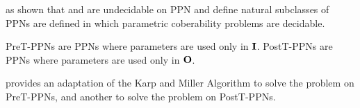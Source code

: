 \todo{}
\cite{David17} as shown that \Ucov and \Ecov are undecidable on \ac{PPN} and define natural subclasses of \acp{PPN} are defined in which parametric coberability problems are decidable.

PreT-PPNs are \acp{PPN} where parameters are used only in $\mathbf{I}$.
PostT-PPNs are \acp{PPN} where parameters are used only in $\mathbf{O}$.

\cite{David17} provides an adaptation of the Karp and Miller Algorithm to solve the \Ucov problem on PreT-\acp{PPN}, and another to solve the \Ecov problem on PostT-\acp{PPN}.

